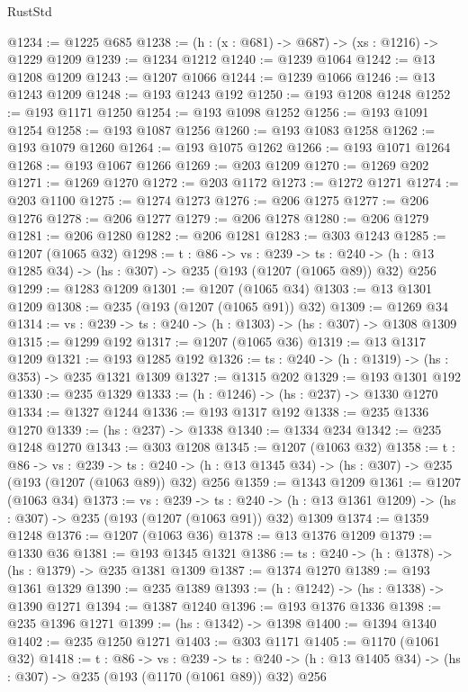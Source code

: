 \begin{lexlean}{RustStd}
\begin{coremodule}
@1234 := @1225 @685
@1238 := (h : (x : @681) -> @687) -> (xs : @1216) -> @1229 @1209
@1239 := @1234 @1212
@1240 := @1239 @1064
@1242 := @13 @1208 @1209
@1243 := @1207 @1066
@1244 := @1239 @1066
@1246 := @13 @1243 @1209
@1248 := @193 @1243 @192
@1250 := @193 @1208 @1248
@1252 := @193 @1171 @1250
@1254 := @193 @1098 @1252
@1256 := @193 @1091 @1254
@1258 := @193 @1087 @1256
@1260 := @193 @1083 @1258
@1262 := @193 @1079 @1260
@1264 := @193 @1075 @1262
@1266 := @193 @1071 @1264
@1268 := @193 @1067 @1266
@1269 := @203 @1209
@1270 := @1269 @202
@1271 := @1269 @1270
@1272 := @203 @1172
@1273 := @1272 @1271
@1274 := @203 @1100
@1275 := @1274 @1273
@1276 := @206 @1275
@1277 := @206 @1276
@1278 := @206 @1277
@1279 := @206 @1278
@1280 := @206 @1279
@1281 := @206 @1280
@1282 := @206 @1281
@1283 := @303 @1243
@1285 := @1207 (@1065 @32)
@1298 := {t : @86} ->
  {vs : @239} ->
  {ts : @240} -> (h : @13 @1285 @34) -> (hs : @307) -> @235 (@193 (@1207 (@1065 @89)) @32) @256
@1299 := @1283 @1209
@1301 := @1207 (@1065 @34)
@1303 := @13 @1301 @1209
@1308 := @235 (@193 (@1207 (@1065 @91)) @32)
@1309 := @1269 @34
@1314 := {vs : @239} -> {ts : @240} -> (h : @1303) -> (hs : @307) -> @1308 @1309
@1315 := @1299 @192
@1317 := @1207 (@1065 @36)
@1319 := @13 @1317 @1209
@1321 := @193 @1285 @192
@1326 := {ts : @240} -> (h : @1319) -> (hs : @353) -> @235 @1321 @1309
@1327 := @1315 @202
@1329 := @193 @1301 @192
@1330 := @235 @1329
@1333 := (h : @1246) -> (hs : @237) -> @1330 @1270
@1334 := @1327 @1244
@1336 := @193 @1317 @192
@1338 := @235 @1336 @1270
@1339 := (hs : @237) -> @1338
@1340 := @1334 @234
@1342 := @235 @1248 @1270
@1343 := @303 @1208
@1345 := @1207 (@1063 @32)
@1358 := {t : @86} ->
  {vs : @239} ->
  {ts : @240} -> (h : @13 @1345 @34) -> (hs : @307) -> @235 (@193 (@1207 (@1063 @89)) @32) @256
@1359 := @1343 @1209
@1361 := @1207 (@1063 @34)
@1373 := {vs : @239} ->
  {ts : @240} -> (h : @13 @1361 @1209) -> (hs : @307) -> @235 (@193 (@1207 (@1063 @91)) @32) @1309
@1374 := @1359 @1248
@1376 := @1207 (@1063 @36)
@1378 := @13 @1376 @1209
@1379 := @1330 @36
@1381 := @193 @1345 @1321
@1386 := {ts : @240} -> (h : @1378) -> (hs : @1379) -> @235 @1381 @1309
@1387 := @1374 @1270
@1389 := @193 @1361 @1329
@1390 := @235 @1389
@1393 := (h : @1242) -> (hs : @1338) -> @1390 @1271
@1394 := @1387 @1240
@1396 := @193 @1376 @1336
@1398 := @235 @1396 @1271
@1399 := (hs : @1342) -> @1398
@1400 := @1394 @1340
@1402 := @235 @1250 @1271
@1403 := @303 @1171
@1405 := @1170 (@1061 @32)
@1418 := {t : @86} ->
  {vs : @239} ->
  {ts : @240} -> (h : @13 @1405 @34) -> (hs : @307) -> @235 (@193 (@1170 (@1061 @89)) @32) @256

\end{coremodule}
\end{lexlean}
